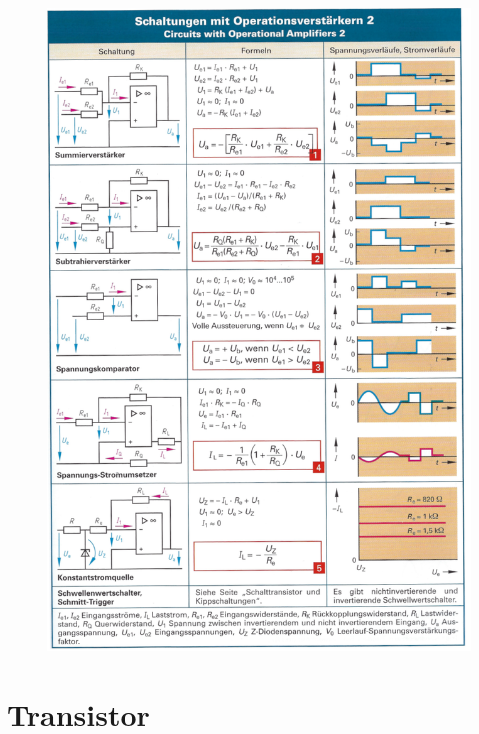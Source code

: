 \documentclass[a5paper, 12pt, twoside]{scrartcl}
\begin{document}
\begin{figure}[H]
  \centering
  \includegraphics[width=.95\textwidth]{OPV2}
\end{figure}

\section{Transistor}
\end{document}
